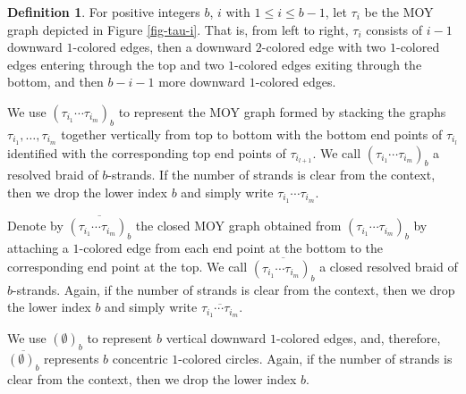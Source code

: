 \documentclass{amsart}
\theoremstyle{plain}
\theoremstyle{definition}
\newtheorem{definition}[theorem]{Definition}
\theoremstyle{remark}
\numberwithin{equation}{section}
\begin{document}
\begin{definition}\label{def-resolved-braids}
For positive integers $b$, $i$ with $1\leq i\leq b-1$, let $\tau_i$ be the MOY graph depicted in Figure \ref{fig-tau-i}. That is, from left to right, $\tau_i$ consists of $i-1$ downward $1$-colored edges, then a downward $2$-colored edge with two $1$-colored edges entering through the top and two $1$-colored edges exiting through the bottom, and then $b-i-1$ more downward $1$-colored edges. 

We use $(\tau_{i_1}\cdots\tau_{i_m})_b$ to represent the MOY graph formed by stacking the graphs $\tau_{i_1},\dots,\tau_{i_m}$ together vertically from top to bottom with the bottom end points of $\tau_{i_l}$ identified with the corresponding top end points of $\tau_{i_{l+1}}$. We call $(\tau_{i_1}\cdots\tau_{i_m})_b$ a resolved braid of $b$-strands. If the number of strands is clear from the context, then we drop the lower index $b$ and simply write $\tau_{i_1}\cdots\tau_{i_m}$.

Denote by $\overline{(\tau_{i_1}\cdots\tau_{i_m})_b}$ the closed MOY graph obtained from $(\tau_{i_1}\cdots\tau_{i_m})_b$ by attaching a $1$-colored edge from each end point at the bottom to the corresponding end point at the top. We call $\overline{(\tau_{i_1}\cdots\tau_{i_m})_b}$ a closed resolved braid of $b$-strands. Again, if the number of strands is clear from the context, then we drop the lower index $b$ and simply write $\overline{\tau_{i_1}\cdots\tau_{i_m}}$.

We use $(\emptyset)_b$ to represent $b$ vertical downward $1$-colored edges, and, therefore, $\overline{(\emptyset)_b}$ represents $b$ concentric $1$-colored circles. Again, if the number of strands is clear from the context, then we drop the lower index $b$.
\end{definition}
\end{document}
